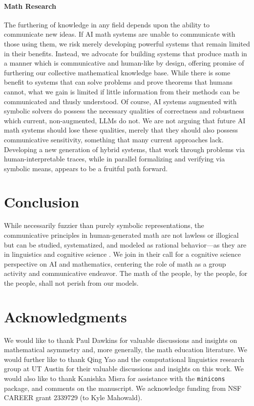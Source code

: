 \documentclass{article}
\begin{document}
\paragraph{Math Research}
The furthering of knowledge in any field depends upon the ability to communicate new ideas. If AI math systems are unable to communicate with those using them, we risk merely developing powerful systems that remain limited in their benefits. Instead, we advocate for building systems that produce math in a manner which is communicative and human-like by design, offering promise of furthering our collective mathematical knowledge base. While there is some benefit to systems that can solve problems and prove theorems that humans cannot, what we gain is limited if little information from their methods can be communicated and thusly understood. Of course, AI systems augmented with symbolic solvers do possess the necessary qualities of correctness and robustness which current, non-augmented, LLMs do not. We are not arguing that future AI math systems should lose these qualities, merely that they should also possess communicative sensitivity, something that many current approaches lack. Developing a new generation of hybrid systems, that work through problems via human-interpretable traces, while in parallel formalizing and verifying via symbolic means, appears to be a fruitful path forward.

\section{Conclusion}

While necessarily fuzzier than purely symbolic representations, the communicative principles in human-generated math are not lawless or illogical but can be studied, systematized, and modeled as rational behavior---as they are in linguistics and cognitive science \citep{clark1996using,frank2012predicting,gibson2019efficiency}.
We join \citet{zhang2023ai} in their call for a cognitive science perspective on AI and mathematics, centering the role of math as a group activity and communicative endeavor.
The math of the people, by the people, for the people, shall not perish from our models. 

\section*{Acknowledgments}
We would like to thank Paul Dawkins for valuable discussions and insights on mathematical asymmetry and, more generally, the math education literature. We would further like to thank Qing Yao and the computational linguistics research group at UT
Austin for their valuable discussions and insights on this work. We would also like to thank Kanishka Misra for assistance with the \texttt{minicons} package, and comments on the manuscript.
We acknowledge funding from NSF CAREER grant 2339729 (to Kyle Mahowald).
  

\appendix
\end{document}
